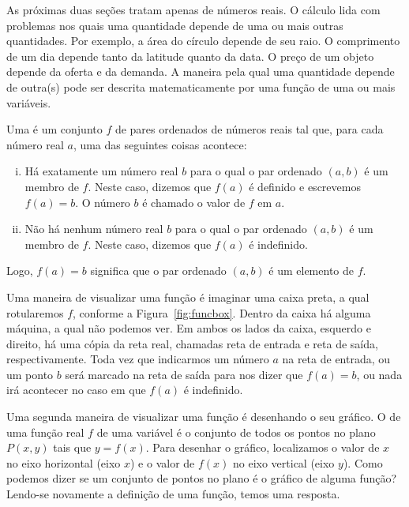 As próximas duas seções tratam apenas de números reais. O cálculo
lida com problemas nos quais uma quantidade depende de uma ou mais
outras quantidades. Por exemplo, a área do círculo depende de seu
raio. O comprimento de um dia depende tanto da latitude quanto da
data. O preço de um objeto depende da oferta e da demanda. A maneira
pela qual uma quantidade depende de outra(s) pode ser descrita
matematicamente por uma função de uma ou mais variáveis.

\begin{defin}
Uma  é um conjunto $f$ de pares
ordenados de números reais tal que, para cada número real $a$, uma
das seguintes coisas acontece:

\begin{enumerate}[(i)]
\item Há exatamente um número real $b$ para o qual o par ordenado $(a, b)$
é um membro de $f$. Neste caso, dizemos que $f(a)$ é definido e
escrevemos $f(a) = b$. O número $b$ é chamado o valor de $f$ em $a$.
\item Não há nenhum número real $b$ para o qual o par ordenado $(a, b)$
é um membro de $f$. Neste caso, dizemos que $f(a)$ é indefinido.
\end{enumerate}
\end{defin}

Logo, $f(a) = b$ significa que o par ordenado $(a, b)$ é um elemento
de $f$.

Uma maneira de visualizar uma função é imaginar uma caixa preta, a qual
rotularemos $f$, conforme a Figura~\ref{fig:funcbox}. Dentro da caixa há
alguma máquina, a qual não podemos ver. Em ambos os lados da caixa,
esquerdo e direito, há uma cópia da reta real, chamadas reta de entrada
e reta de saída, respectivamente. Toda vez que indicarmos um número $a$
na reta de entrada, ou um ponto $b$ será marcado na reta de saída para
nos dizer que $f(a) = b$, ou nada irá acontecer no caso em que $f(a)$
é indefinido.


Uma segunda maneira de visualizar uma função é desenhando o seu gráfico.
O  de uma função real $f$ de uma variável é o conjunto de
todos os pontos no plano $P(x, y)$ tais que $y = f(x)$. Para desenhar o
gráfico, localizamos o valor de $x$ no eixo horizontal (eixo $x$) e
o valor de $f(x)$ no eixo vertical (eixo $y$). Como podemos dizer se
um conjunto de pontos no plano é o gráfico de alguma função? Lendo-se
novamente a definição de uma função, temos uma resposta.


